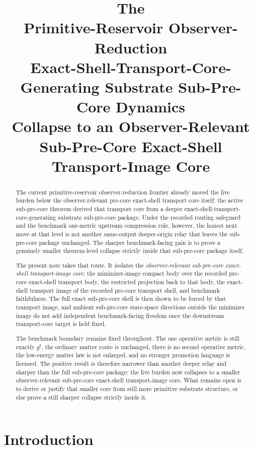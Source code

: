 \documentclass[11pt]{article}
\title{\textbf{The \TheoryName{}}\\[0.4em]
\large Primitive-Reservoir Observer-Reduction\\
\large Exact-Shell-Transport-Core-Generating Substrate Sub-Pre-Core Dynamics\\
\large Collapse to an Observer-Relevant Sub-Pre-Core Exact-Shell Transport-Image Core}
\author{}
\date{}
\newcommand{\CompletedMetric}{g^{\sharp}}
\begin{document}
\maketitle

\begin{abstract}
The current primitive-reservoir observer-reduction frontier already moved the live burden below the observer-relevant pre-core exact-shell transport core itself: the active sub-pre-core theorem derived that transport core from a deeper exact-shell-transport-core-generating substrate sub-pre-core package. Under the recorded routing safeguard and the benchmark one-metric upstream compression rule, however, the honest next move at that level is not another same-output deeper-origin relay that leaves the sub-pre-core package unchanged. The sharper benchmark-facing gain is to prove a genuinely smaller theorem-level collapse strictly inside that sub-pre-core package itself.

The present note takes that route. It isolates the \emph{observer-relevant sub-pre-core exact-shell transport-image core}: the minimizer-image compact body over the recorded pre-core exact-shell transport body, the restricted projection back to that body, the exact-shell transport image of the recorded pre-core transport shell, and benchmark faithfulness. The full exact sub-pre-core shell is then shown to be forced by that transport image, and ambient sub-pre-core state-space directions outside the minimizer image do not add independent benchmark-facing freedom once the downstream transport-core target is held fixed.

The benchmark boundary remains fixed throughout. The one operative metric is still exactly \(\CompletedMetric\), the ordinary matter route is unchanged, there is no second operative metric, the low-energy matter law is not enlarged, and no stronger promotion language is licensed. The positive result is therefore narrower than another deeper relay and sharper than the full sub-pre-core package: the live burden now collapses to a smaller observer-relevant sub-pre-core exact-shell transport-image core. What remains open is to derive or justify that smaller core from still more primitive substrate structure, or else prove a still sharper collapse strictly inside it.
\end{abstract}

\section{Introduction}
\end{document}
